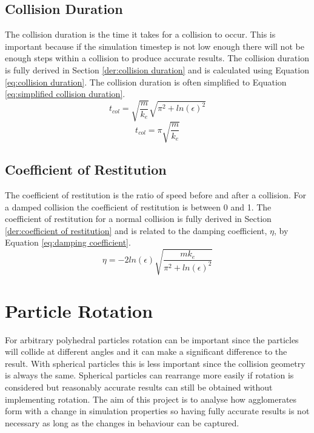 \documentclass[a4paper,11pt,titlepage]{report}
\begin{document}
\subsection{Collision Duration}
\label{sec:collision duration}
The collision duration is the time it takes for a collision to occur. This is important because if the simulation timestep is not low enough there will not be enough steps within a collision to produce accurate results. The collision duration is fully derived in Section \ref{der:collision duration} and is calculated using Equation \ref{eq:collision duration}. The collision duration is often simplified to Equation \ref{eq:simplified collision duration}.
\begin{equation}
t_{col} = \sqrt{\dfrac{m}{k_e}}\sqrt{\pi^2 + ln(\epsilon)^2}
\label{eq:collision duration}
\end{equation}
\begin{equation}
t_{col} = \pi \sqrt{\dfrac{m}{k_e}}
\label{eq:simplified collision duration}
\end{equation}
\subsection{Coefficient of Restitution}
The coefficient of restitution is the ratio of speed before and after a collision. For a damped collision the coefficient of restitution is between 0 and 1. The coefficient of restitution for a normal collision is fully derived in Section \ref{der:coefficient of restitution} and is related to the damping coefficient, $\eta$, by Equation \ref{eq:damping coefficient}.
\begin{equation}
\eta = - 2 ln(\epsilon) \sqrt{\dfrac{m k_e}{\pi^2 + ln(\epsilon)^2}}
\label{eq:damping coefficient}
\end{equation}
\section{Particle Rotation}
For arbitrary polyhedral particles rotation can be important since the particles will collide at different angles and it can make a significant difference to the result. With spherical particles this is less important since the collision geometry is always the same. Spherical particles can rearrange more easily if rotation is considered but reasonably accurate results can still be obtained without implementing rotation. The aim of this project is to analyse how agglomerates form with a change in simulation properties so having fully accurate results is not necessary as long as the changes in behaviour can be captured.
\end{document}
